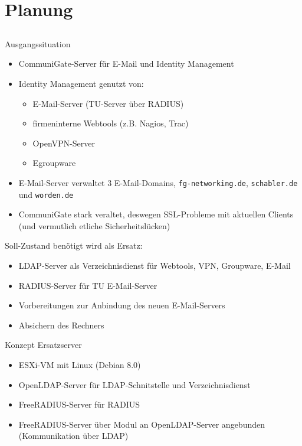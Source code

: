 \documentclass[handout,svgnames]{beamer}
\begin{document}
\section{Planung}
\subsection{}
\begin{frame}{Ausgangssituation}
\begin{itemize}
	\item CommuniGate-Server für E-Mail und Identity Management
	\item Identity Management genutzt von:
	\begin{itemize}
		\item E-Mail-Server (TU-Server über RADIUS)
		\item firmeninterne Webtools (z.B. Nagios, Trac)
		\item OpenVPN-Server
		\item Egroupware
	\end{itemize}
	\item E-Mail-Server verwaltet 3 E-Mail-Domains, \texttt{fg-networking.de}, \texttt{schabler.de} und \texttt{worden.de}
 	\item CommuniGate stark veraltet, deswegen SSL-Probleme mit aktuellen Clients (und vermutlich etliche Sicherheitslücken)
\end{itemize}
\end{frame}

\begin{frame}{Soll-Zustand}
benötigt wird als Ersatz:
\begin{itemize}
	\item LDAP-Server als Verzeichnisdienst für Webtools, VPN, Groupware, E-Mail
	\item RADIUS-Server für TU E-Mail-Server
	\item Vorbereitungen zur Anbindung des neuen E-Mail-Servers
	\item Absichern des Rechners
\end{itemize}
\end{frame}


\begin{frame}{Konzept Ersatzserver}
\begin{itemize}
	\item ESXi-VM mit Linux (Debian 8.0)
	\item OpenLDAP-Server für LDAP-Schnitstelle und Verzeichnisdienst
	\item FreeRADIUS-Server für RADIUS
	\item FreeRADIUS-Server über Modul an OpenLDAP-Server angebunden (Kommunikation über LDAP)
\end{itemize}
\end{frame}
\end{document}
